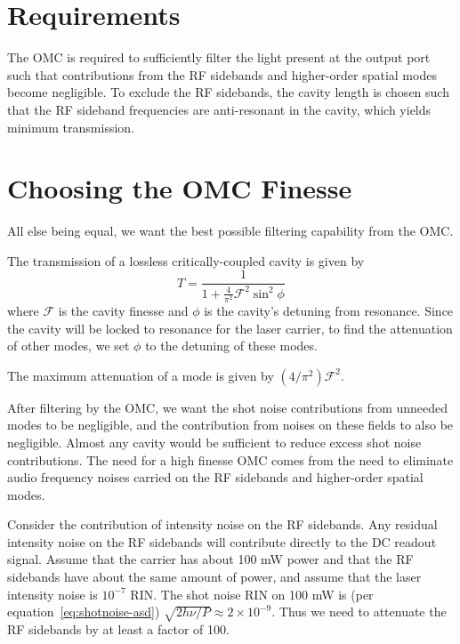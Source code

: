 \section{Requirements}

The OMC is required to sufficiently filter the light present at the
output port such that contributions from the RF sidebands and higher-order
spatial modes become negligible. To exclude the RF sidebands, the
cavity length is chosen such that the RF sideband frequencies are
anti-resonant in the cavity, which yields minimum transmission.

\section{Choosing the OMC Finesse}

All else being equal, we want the best possible filtering capability
from the OMC.

The transmission of a lossless critically-coupled cavity is given by
\begin{equation}
T = \frac{1}{1 + \frac{4}{\pi^2}\mathcal{F}^2\sin^2\phi}
\end{equation}
where $\mathcal{F}$ is the cavity finesse and $\phi$ is the cavity's
detuning from resonance.  Since the cavity will be locked to resonance
for the laser carrier, to find the attenuation of other modes, we set
$\phi$ to the detuning of these modes.

The maximum attenuation of a mode is given by $(4/\pi^2)\mathcal{F}^2$.

After filtering by the OMC, we want the shot noise contributions from
unneeded modes to be negligible, and the contribution from noises on
these fields to also be negligible.  Almost any cavity would be
sufficient to reduce excess shot noise contributions.  The need for a
high finesse OMC comes from the need to eliminate audio frequency
noises carried on the RF sidebands and higher-order spatial modes.

Consider the contribution of intensity noise on the RF sidebands.  Any
residual intensity noise on the RF sidebands will contribute directly
to the DC readout signal.  Assume that the carrier has about 100 mW
power and that the RF sidebands have about the same amount of power,
and assume that the laser intensity noise is $10^{-7}$ RIN.  The shot
noise RIN on 100 mW is (per equation~\ref{eq:shotnoise-asd})
$\sqrt{2h\nu/P} \approx 2\times10^{-9}$.  Thus we need to attenuate
the RF sidebands by at least a factor of 100.


